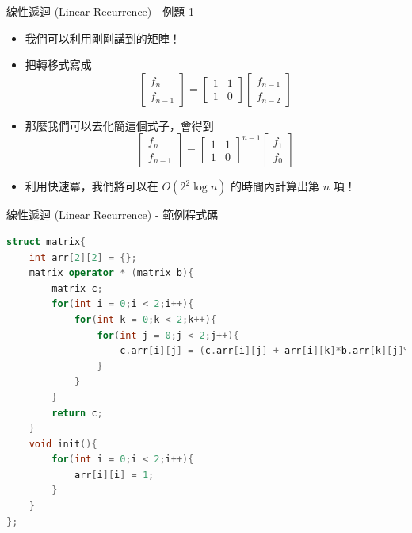 \documentclass[aspectratio=169]{beamer}
\begin{document}
    \begin{frame}{線性遞迴 (Linear Recurrence) - 例題 1}
        \begin{itemize}
            \item 我們可以利用剛剛講到的矩陣！
            \item 把轉移式寫成
            $$\begin{bmatrix}f_n \\ f_{n-1}\end{bmatrix} = \begin{bmatrix} 1 & 1 \\ 1 & 0 \end{bmatrix} \begin{bmatrix}f_{n-1} \\ f_{n-2}\end{bmatrix}$$
            \item<2-> 那麼我們可以去化簡這個式子，會得到
            $$\begin{bmatrix}f_n \\ f_{n-1}\end{bmatrix} = \begin{bmatrix} 1 & 1 \\ 1 & 0 \end{bmatrix}^{n-1} \begin{bmatrix}f_1 \\ f_0\end{bmatrix}$$
            \item<3-> 利用快速冪，我們將可以在 $O(2^2 \log n)$ 的時間內計算出第 $n$ 項！
        \end{itemize}
    \end{frame}
    
    \begin{frame}[fragile]{線性遞迴 (Linear Recurrence) - 範例程式碼}
        \begin{lstlisting}[language=C++, basicstyle=\ttfamily \tiny]
struct matrix{
    int arr[2][2] = {};
    matrix operator * (matrix b){
        matrix c;
        for(int i = 0;i < 2;i++){
            for(int k = 0;k < 2;k++){
                for(int j = 0;j < 2;j++){
                    c.arr[i][j] = (c.arr[i][j] + arr[i][k]*b.arr[k][j]%MOD)%MOD;
                }
            }
        }
        return c;
    } 
    void init(){
        for(int i = 0;i < 2;i++){
            arr[i][i] = 1;
        }
    }
};
        \end{lstlisting}
    \end{frame}
    
\end{document}
